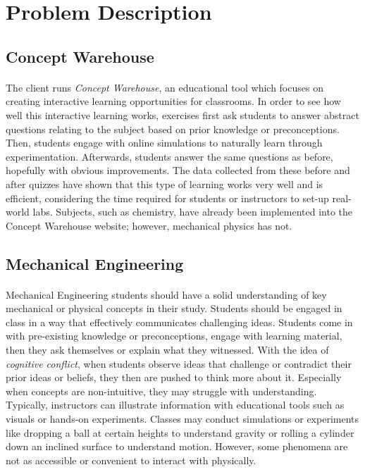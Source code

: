 \documentclass[10pt]{article}
\begin{document}
\section{Problem Description}

\subsection{Concept Warehouse}
\paragraph{}The client runs \textit{Concept Warehouse}, an educational tool which focuses on creating interactive learning opportunities for classrooms. In order to see how well this interactive learning works, exercises first ask students to answer abstract questions relating to the subject based on prior knowledge or preconceptions. Then, students engage with online simulations to naturally learn through experimentation. Afterwards, students answer the same questions as before, hopefully with obvious improvements. The data collected from these before and after quizzes have shown that this type of learning works very well and is efficient, considering the time required for students or instructors to set-up real-world labs. Subjects, such as chemistry, have already been implemented into the Concept Warehouse website; however, mechanical physics has not.


\subsection{Mechanical Engineering}
\paragraph{}Mechanical Engineering students should have a solid understanding of key mechanical or physical concepts in their study. Students should be engaged in class in a way that effectively communicates challenging ideas. Students come in with pre-existing knowledge or preconceptions, engage with learning material, then they ask themselves or explain what they witnessed. With the idea of \textit{cognitive conflict}, when students observe ideas that challenge or contradict their prior ideas or beliefs, they then are pushed to think more about it. Especially when concepts are non-intuitive, they may struggle with understanding. Typically, instructors can illustrate information with educational tools such as visuals or hands-on experiments. Classes may conduct simulations or experiments like dropping a ball at certain heights to understand gravity or rolling a cylinder down an inclined surface to understand motion. However, some phenomena are not as accessible or convenient to interact with physically.
\end{document}
